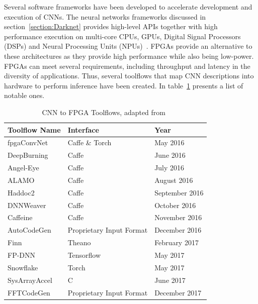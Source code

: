     Several software frameworks have been developed to accelerate development and
    execution of CNNs. The neural networks frameworks discussed in
    section~\ref{section:Darknet} provides high-level APIs together with high
    performance execution on multi-core CPUs, GPUs, Digital Signal Processors (DSPs)
    and Neural Processing Units (NPUs)~\cite{smartphones}. FPGAs provide an
    alternative to these architectures as they provide high performance while also
    being low-power. FPGAs can meet several requirements, including throughput and latency
    in the diversity of applications. Thus, several toolflows that map CNN descriptions
    into hardware to perform inference have been created. In
    table~\ref{table:toolflow} presents a list of notable ones.
    \begin{table}[!htpb]
        \centering
        \begin{tabular}{lll}
        \hline
        \textbf{Toolflow Name} & \textbf{Interface}       & \textbf{Year}  \\ \hline
        fpgaConvNet            & Caffe \& Torch           & May 2016       \\
        DeepBurning            & Caffe                    & June 2016      \\
        Angel-Eye              & Caffe                    & July 2016      \\
        ALAMO                  & Caffe                    & August 2016    \\
        Haddoc2                & Caffe                    & September 2016 \\
        DNNWeaver              & Caffe                    & October 2016   \\
        Caffeine               & Caffe                    & November 2016  \\
        AutoCodeGen            & Proprietary Input Format & December 2016  \\
        Finn                   & Theano                   & February 2017  \\
        FP-DNN                 & Tensorflow               & May 2017       \\
        Snowflake              & Torch                    & May 2017       \\
        SysArrayAccel          & C                        & June 2017      \\
        FFTCodeGen             & Proprietary Input Format & December 2017  \\ \hline
        \end{tabular}
        \label{table:toolflow}
        \caption{CNN to FPGA Toolflows, adapted from~\cite{misc:cnntofpga}}
    \end{table}


